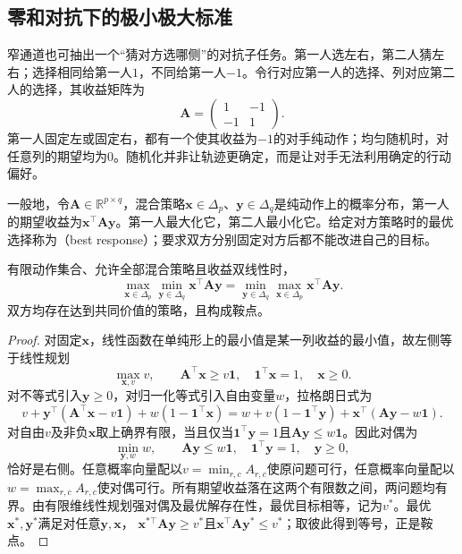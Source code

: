 \subsection{零和对抗下的极小极大标准}
\label{sec:rl-multi-agent-minimax}

窄通道也可抽出一个“猜对方选哪侧”的对抗子任务。第一人选左右，第二人猜左右；选择相同给第一人$1$，不同给第一人$-1$。令行对应第一人的选择、列对应第二人的选择，其收益矩阵为
\begin{equation}
 \bm A=
 \begin{pmatrix}1&-1\\-1&1\end{pmatrix}.
 \label{eq:rl-multi-agent-matching}
\end{equation}
第一人固定左或固定右，都有一个使其收益为$-1$的对手纯动作；均匀随机时，对任意列的期望均为0。随机化并非让轨迹更确定，而是让对手无法利用确定的行动偏好。

一般地，令$\bm A\in\mathbb R^{p\times q}$，混合策略$\bm x\in\Delta_p$、$\bm y\in\Delta_q$是纯动作上的概率分布，第一人的期望收益为$\bm x^\top\bm A\bm y$。第一人最大化它，第二人最小化它。给定对方策略时的最优选择称为（best response）；要求双方分别固定对方后都不能改进自己的目标。

\begin{theorem}[有限零和博弈的极小极大等式]
\label{thm:rl-multi-agent-minimax}
有限动作集合、允许全部混合策略且收益双线性时，
\[
 \max_{\bm x\in\Delta_p}\min_{\bm y\in\Delta_q}
 \bm x^\top\bm A\bm y
 =
 \min_{\bm y\in\Delta_q}\max_{\bm x\in\Delta_p}
 \bm x^\top\bm A\bm y.
\]
双方均存在达到共同价值的策略，且构成鞍点。
\end{theorem}
\begin{proof}
对固定$\bm x$，线性函数在单纯形上的最小值是某一列收益的最小值，故左侧等于线性规划
\[
 \max_{\bm x,v}v,\qquad
 \bm A^\top\bm x\geq v\bm 1,\quad
 \bm 1^\top\bm x=1,\quad \bm x\geq0.
\]
对不等式引入$\bm y\geq0$，对归一化等式引入自由变量$w$，拉格朗日式为
\[
 v+\bm y^\top(\bm A^\top\bm x-v\bm1)
       +w(1-\bm1^\top\bm x)
 =w+v(1-\bm1^\top\bm y)
       +\bm x^\top(\bm A\bm y-w\bm1).
\]
对自由$v$及非负$\bm x$取上确界有限，当且仅当$\bm1^\top\bm y=1$且$\bm A\bm y\leq w\bm1$。因此对偶为
\[
 \min_{\bm y,w}w,\qquad
 \bm A\bm y\leq w\bm1,\quad
 \bm1^\top\bm y=1,\quad \bm y\geq0,
\]
恰好是右侧。任意概率向量配以$v=\min_{r,c}A_{r,c}$使原问题可行，任意概率向量配以$w=\max_{r,c}A_{r,c}$使对偶可行。所有期望收益落在这两个有限数之间，两问题均有界。由有限维线性规划强对偶及最优解存在性，最优目标相等，记为$v^*$。最优$\bm x^*,\bm y^*$满足对任意$\bm y,\bm x$，
$\bm x^{*\top}\bm A\bm y\geq v^*$且$\bm x^\top\bm A\bm y^*\leq v^*$；取彼此得到等号，正是鞍点。
\end{proof}

